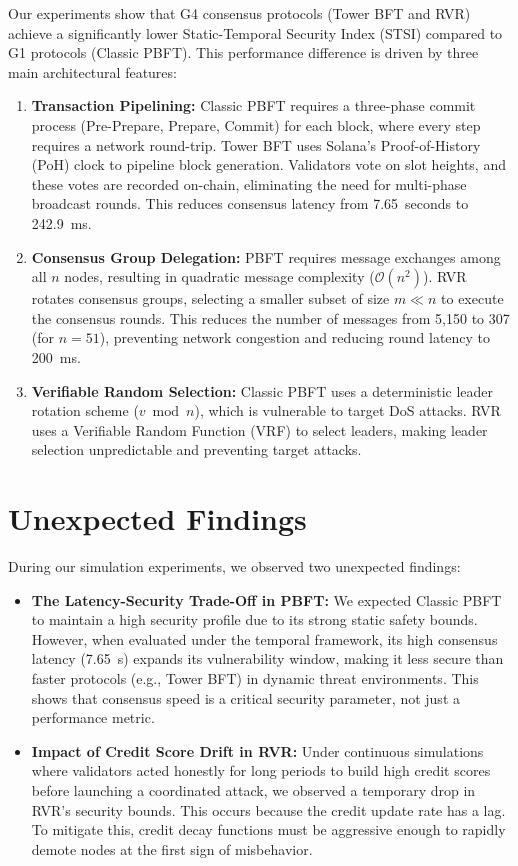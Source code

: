 \documentclass[12pt, oneside, a4paper]{report}
\theoremstyle{definition}
\theoremstyle{remark}
\begin{document}
Our experiments show that G4 consensus protocols (Tower BFT and RVR) achieve a significantly lower Static-Temporal Security Index (STSI) compared to G1 protocols (Classic PBFT). This performance difference is driven by three main architectural features:
\begin{enumerate}
  \item \textbf{Transaction Pipelining:} Classic PBFT requires a three-phase commit process (Pre-Prepare, Prepare, Commit) for each block, where every step requires a network round-trip. Tower BFT uses Solana's Proof-of-History (PoH) clock to pipeline block generation. Validators vote on slot heights, and these votes are recorded on-chain, eliminating the need for multi-phase broadcast rounds. This reduces consensus latency from 7.65~seconds to 242.9~ms.
  \item \textbf{Consensus Group Delegation:} PBFT requires message exchanges among all $n$ nodes, resulting in quadratic message complexity ($\mathcal{O}(n^2)$). RVR rotates consensus groups, selecting a smaller subset of size $m \ll n$ to execute the consensus rounds. This reduces the number of messages from 5,150 to 307 (for $n=51$), preventing network congestion and reducing round latency to 200~ms.
  \item \textbf{Verifiable Random Selection:} Classic PBFT uses a deterministic leader rotation scheme ($v \bmod n$), which is vulnerable to target DoS attacks. RVR uses a Verifiable Random Function (VRF) to select leaders, making leader selection unpredictable and preventing target attacks.
\end{enumerate}

\section{Unexpected Findings}
\label{sec:dis:unexpected}

During our simulation experiments, we observed two unexpected findings:
\begin{itemize}
  \item \textbf{The Latency-Security Trade-Off in PBFT:} We expected Classic PBFT to maintain a high security profile due to its strong static safety bounds. However, when evaluated under the temporal framework, its high consensus latency (7.65~s) expands its vulnerability window, making it less secure than faster protocols (e.g., Tower BFT) in dynamic threat environments. This shows that consensus speed is a critical security parameter, not just a performance metric.
  \item \textbf{Impact of Credit Score Drift in RVR:} Under continuous simulations where validators acted honestly for long periods to build high credit scores before launching a coordinated attack, we observed a temporary drop in RVR's security bounds. This occurs because the credit update rate has a lag. To mitigate this, credit decay functions must be aggressive enough to rapidly demote nodes at the first sign of misbehavior.
\end{itemize}
\end{document}
